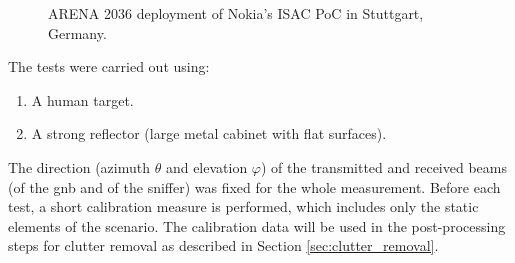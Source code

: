 \begin{figure}[b!]
	\centering
	
	\hfill
	\caption[]{\small ARENA 2036 deployment of Nokia's ISAC PoC in Stuttgart, Germany.}
	\label{fig:arena_pics}
\end{figure}

 
The tests were carried out using:

\begin{enumerate}
	\item A human target.
	\item A strong reflector (large metal cabinet with flat surfaces).
\end{enumerate}

The direction (azimuth $\theta$ and elevation $\varphi$) of the transmitted and received beams (\ie of the \gls{gnb} and of the sniffer) was fixed for the whole measurement.
Before each test, a short calibration measure is performed, which includes only the static elements of the scenario. The calibration data will be used in the post-processing steps for clutter removal as described in Section \ref{sec:clutter_removal}.

